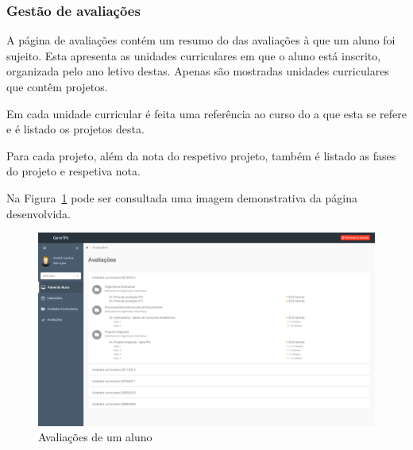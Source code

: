 \subsubsection{Gestão de avaliações}

A página de avaliações contém um resumo do das avaliações à que um aluno foi sujeito. Esta apresenta as unidades curriculares em que o aluno está inscrito, organizada pelo ano letivo destas. Apenas são mostradas unidades curriculares que contêm projetos.

Em cada unidade curricular é feita uma referência ao curso do a que esta se refere e é listado os projetos desta.

Para cada projeto, além da nota do respetivo projeto, também é listado as fases do projeto e respetiva nota.

Na Figura~\ref{fig:student_grades} pode ser consultada uma imagem demonstrativa da página desenvolvida.

\begin{figure}[H]
  \centering
  \includegraphics[width=1\textwidth,center]{images/implementacao/alunos/grades}
  \caption{Avaliações de um aluno}
  \label{fig:student_grades}
\end{figure}
